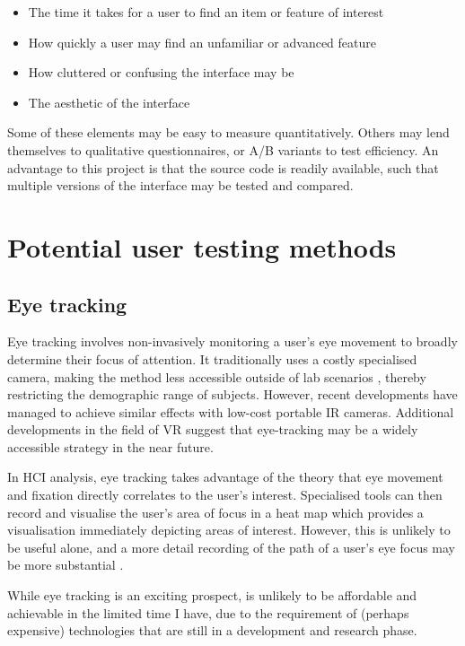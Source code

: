 \documentclass{scrartcl}
\begin{document}
\begin{itemize}
	\item The time it takes for a user to find an item or feature of interest
	\item How quickly a user may find an unfamiliar or advanced feature
	\item How cluttered or confusing the interface may be
	\item The aesthetic of the interface
\end{itemize}

Some of these elements may be easy to measure quantitatively. Others may lend themselves to qualitative questionnaires, or A/B variants to test efficiency. An advantage to this project is that the source code is readily available, such that multiple versions of the interface may be tested and compared.

\section{Potential user testing methods}
\subsection{Eye tracking}
Eye tracking involves non-invasively monitoring a user's eye movement to broadly determine their focus of attention. \cite{poole_eye_2006} It traditionally uses a costly specialised camera, making the method less accessible outside of lab scenarios \cite{devicecomparison}, thereby restricting the demographic range of subjects. However, recent developments \cite{lowcosttracker} \cite{ho_low_2014} have managed to achieve similar effects with low-cost portable IR cameras. Additional developments in the field of VR suggest that eye-tracking may be a widely accessible strategy in the near future.

In HCI analysis, eye tracking takes advantage of the theory that eye movement and fixation directly correlates to the user's interest. \cite{poole_eye_2006} Specialised tools can then record and visualise the user's area of focus in a heat map which provides a visualisation immediately depicting areas of interest. However, this is unlikely to be useful alone, and a more detail recording of the path of a user's eye focus may be more substantial \cite{gazepatterns}.

While eye tracking is an exciting prospect, is unlikely to be affordable and achievable in the limited time I have, due to the requirement of (perhaps expensive) technologies that are still in a development and research phase.
\end{document}
